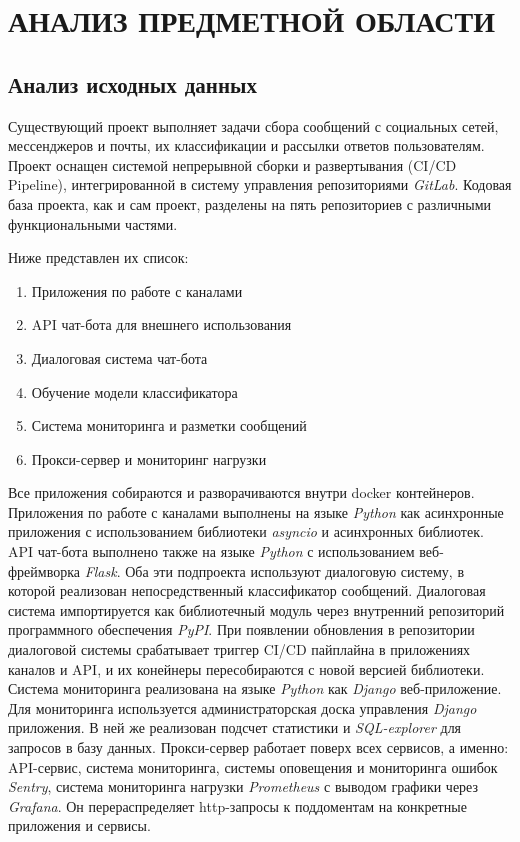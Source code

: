 \section{АНАЛИЗ ПРЕДМЕТНОЙ ОБЛАСТИ}
    \subsection{Анализ исходных данных}
    Существующий проект выполняет задачи сбора сообщений с социальных сетей, мессенджеров и почты,
    их классификации и рассылки ответов пользователям.
    Проект оснащен системой непрерывной сборки и развертывания (CI/CD Pipeline), интегрированной в
    систему управления репозиториями \textit{GitLab}\cite{docs.gitlab}.
    Кодовая база проекта, как и сам проект, разделены на пять репозиториев с различными
    функциональными частями.
    
    Ниже представлен их список:
    \begin{enumerate}
        \item Приложения по работе с каналами
        \item API чат-бота для внешнего использования
        \item Диалоговая система чат-бота
        \item Обучение модели классификатора
        \item Система мониторинга и разметки сообщений
        \item Прокси-сервер и мониторинг нагрузки
    \end{enumerate}
    
    Все приложения собираются и разворачиваются внутри docker контейнеров.
    Приложения по работе с каналами выполнены на языке \textit{Python} как асинхронные приложения
    с использованием библиотеки \textit{asyncio} и асинхронных библиотек.
    API чат-бота выполнено также на языке \textit{Python} с использованием веб-фреймворка \textit{Flask}.
    Оба эти подпроекта используют диалоговую систему, в которой реализован непосредственный
    классификатор сообщений.
    Диалоговая система импортируется как библиотечный модуль через внутренний репозиторий
    программного обеспечения \textit{PyPI}.
    При появлении обновления в репозитории диалоговой системы срабатывает триггер CI/CD пайплайна
    в приложениях каналов и API, и их конейнеры пересобираются с новой версией библиотеки.
    Система мониторинга реализована на языке \textit{Python} как \textit{Django} веб-приложение.
    Для мониторинга используется администраторская доска управления \textit{Django} приложения.
    В ней же реализован подсчет статистики и \textit{SQL-explorer} для запросов в базу данных.
    Прокси-сервер работает поверх всех сервисов, а именно: API-сервис, система мониторинга,
    системы оповещения и мониторинга ошибок \textit{Sentry}\cite{docs.sentry}, система мониторинга
    нагрузки \textit{Prometheus} с выводом графики через \textit{Grafana}.
    Он перераспределяет http-запросы к поддоментам на конкретные приложения и сервисы.

